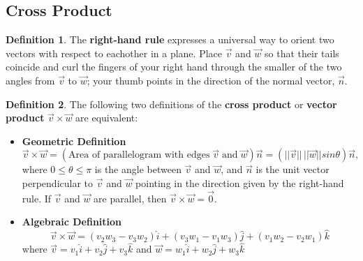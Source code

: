\documentclass[12pt, a4paper]{article}
\theoremstyle{plain}
\theoremstyle{definition}
\newtheorem{definition}{Definition}[section]
\theoremstyle{remark}
\begin{document}
\newpage

\subsection{Cross Product}

\begin{definition}
The \textbf{right-hand rule} expresses a universal way to orient two vectors with respect to eachother in a plane. Place $\vec{v}$ and $\vec{w}$ so that their tails coincide and curl the fingers of your right hand through the smaller of the two angles from $\vec{v}$ to $\vec{w}$; your thumb points in the direction of the normal vector, $\vec{n}$.
\end{definition}



\begin{center} 
\end{center}  

\begin{definition}
The following two definitions of the \textbf{cross product} or \textbf{vector product} $\vec{v} \times \vec{w}$ are equivalent:
\begin{itemize}
\item \textbf{Geometric Definition}
$$  \vec{v} \times \vec{w} = \left( \text{Area of parallelogram with edges} \; \vec{v} \; \text{and} \; \vec{w}  \right) \vec{n} = (||\vec{v}|| \, ||\vec{w}|| sin \theta)\vec{n}, $$
where $0 \le \theta \le \pi$ is the angle between $\vec{v}$ and $\vec{w}$, and $\vec{n}$ is the unit vector perpendicular to $\vec{v}$ and $\vec{w}$ pointing in the direction given by the right-hand rule. If $\vec{v}$ and $\vec{w}$ are parallel, then $\vec{v} \times \vec{w} = \vec{0}$.



\item \textbf{Algebraic Definition}
$$\vec{v} \times \vec{w} = (v_2w_3 - v_3w_2)\hat{i} + (v_3w_1 - v_1w_3)\hat{j} + (v_1w_2 - v_2w_1)\hat{k} $$
where $\vec{v} = v_1 \hat{i} + v_2 \hat{j} + v_3 \hat{k}$ and $\vec{w} = w_1 \hat{i} + w_2 \hat{j} + w_3 \hat{k}$
\end{itemize}
\end{definition}
\end{document}
